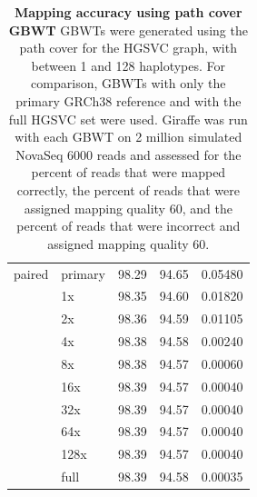 \documentclass[11pt]{ucscthesis}
\begin{document}
\begin{table}[p]
\begin{tabular}{|l|l|r|r|r|}
        \hline
        paired  & primary	& 98.29     & 94.65     & 0.05480 \\
                & 1x	    & 98.35     & 94.60     & 0.01820 \\
                & 2x	    & 98.36     & 94.59     & 0.01105 \\
                & 4x	    & 98.38     & 94.58     & 0.00240 \\
                & 8x	    & 98.38     & 94.57     & 0.00060 \\
                & 16x	    & 98.39     & 94.57     & 0.00040 \\
                & 32x	    & 98.39     & 94.57     & 0.00040 \\
                & 64x	    & 98.39     & 94.57     & 0.00040 \\
                & 128x	    & 98.39     & 94.57     & 0.00040 \\
                & full  	& 98.39     & 94.58     & 0.00035 \\
                

        \hline
        
    \end{tabular}
    \caption[Mapping accuracy using path cover GBWT]{\textbf{Mapping accuracy using path cover GBWT} GBWTs were generated using the path cover for the HGSVC graph, with between 1 and 128 haplotypes. For comparison, GBWTs with only the primary GRCh38 reference and with the full HGSVC set were used. Giraffe was run with each GBWT on 2 million simulated NovaSeq 6000 reads and assessed for the percent of reads that were mapped correctly, the percent of reads that were assigned mapping quality 60, and the percent of reads that were incorrect and assigned mapping quality 60.}
    \label{tab:mapping_accuracy_hgsvc_cover_gbwt}
\end{table}
\end{document}
